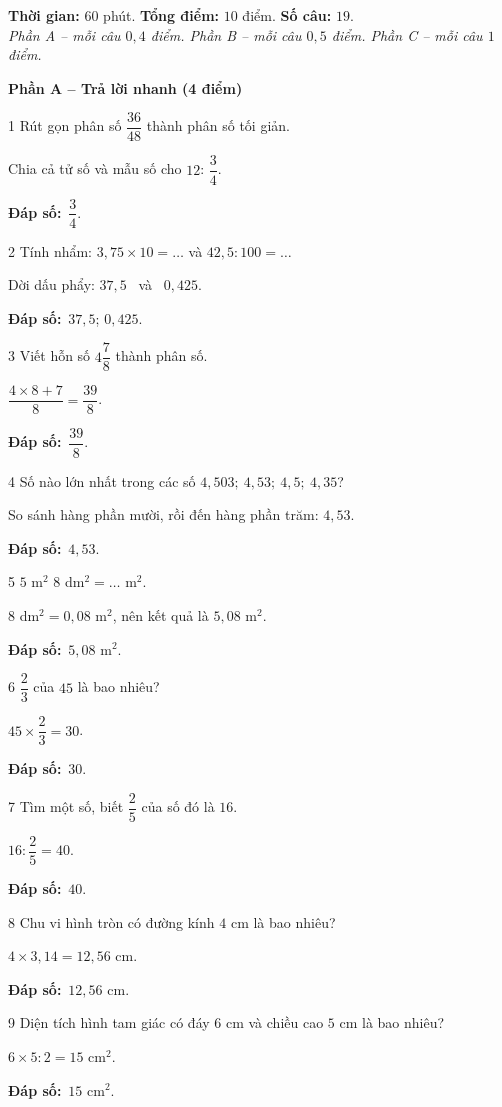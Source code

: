 \documentclass[11pt]{article}
\newif\ifsol \solfalse
\providecommand{\AnsWord}{Đáp số}
\newcommand{\dapso}[1]{\par\textbf{\AnsWord:}\ #1}
\newcommand{\probsol}[1]{%
  \begin{lrbox}{\solmeasure}\begin{minipage}{\dimexpr\linewidth-24pt\relax}#1\end{minipage}\end{lrbox}%
  \ifsol
    \begin{solbox}#1\end{solbox}%
  \else
    \setlength{\solht}{\dimexpr\ht\solmeasure+\dp\solmeasure+0.85cm\relax}%
    \ifdim\solht<1.35cm\setlength{\solht}{1.35cm}\fi
    \begin{tcolorbox}[colback=white,colframe=Line,boxrule=0.8pt,arc=5pt,
      left=8pt,right=8pt,top=4pt,bottom=4pt,height=\solht]{\footnotesize\color{Slate}\itshape\WorkWord}\end{tcolorbox}%
  \fi}
\newcommand{\dividerbar}[1]{\par\vspace{0.6em}\noindent
  \begin{tcolorbox}[enhanced,frame hidden,interior hidden,borderline west={5pt}{0pt}{ProbBlue},
    colback=white,left=12pt,right=12pt,top=5pt,bottom=5pt,arc=4pt]
  {\large\bfseries\color{ProbBlue} #1}\end{tcolorbox}\vspace{0.4em}}
\newcommand{\gap}{\vspace{0.3cm}}
\def\WorkWord{Bài làm:}
\def\AnsWord{Đáp số}
\begin{document}
\begin{knowbox}
\textbf{Thời gian:} $60$ phút. \quad \textbf{Tổng điểm:} $10$ điểm. \quad \textbf{Số câu:} $19$.\\[2pt]\emph{Phần A -- mỗi câu $0{,}4$ điểm. \quad Phần B -- mỗi câu $0{,}5$ điểm. \quad Phần C -- mỗi câu $1$ điểm.}
\end{knowbox}
\gap
\dividerbar{Phần A -- Trả lời nhanh (4 điểm)}
\begin{probbox}{1}{\relax}
Rút gọn phân số $\dfrac{36}{48}$ thành phân số tối giản.
\end{probbox}
\probsol{
Chia cả tử số và mẫu số cho $12$: $\dfrac34$.
\dapso{$\dfrac34$.}}
\gap
\begin{probbox}{2}{\relax}
Tính nhẩm: $3{,}75\times10=\ldots$ \quad và \quad $42{,}5:100=\ldots$
\end{probbox}
\probsol{
Dời dấu phẩy: $37{,}5$ \ và \ $0{,}425$.
\dapso{$37{,}5$; $0{,}425$.}}
\gap
\begin{probbox}{3}{\relax}
Viết hỗn số $4\dfrac78$ thành phân số.
\end{probbox}
\probsol{
$\dfrac{4\times8+7}8=\dfrac{39}8$.
\dapso{$\dfrac{39}8$.}}
\gap
\begin{probbox}{4}{\relax}
Số nào lớn nhất trong các số $4{,}503;\ 4{,}53;\ 4{,}5;\ 4{,}35$?
\end{probbox}
\probsol{
So sánh hàng phần mười, rồi đến hàng phần trăm: $4{,}53$.
\dapso{$4{,}53$.}}
\gap
\begin{probbox}{5}{\relax}
$5$ m$^2$ $8$ dm$^2=\ldots$ m$^2$.
\end{probbox}
\probsol{
$8$ dm$^2=0{,}08$ m$^2$, nên kết quả là $5{,}08$ m$^2$.
\dapso{$5{,}08$ m$^2$.}}
\gap
\begin{probbox}{6}{\relax}
$\dfrac23$ của $45$ là bao nhiêu?
\end{probbox}
\probsol{
$45\times\dfrac23=30$.
\dapso{$30$.}}
\gap
\begin{probbox}{7}{\relax}
Tìm một số, biết $\dfrac25$ của số đó là $16$.
\end{probbox}
\probsol{
$16:\dfrac25=40$.
\dapso{$40$.}}
\gap
\begin{probbox}{8}{\relax}
Chu vi hình tròn có đường kính $4$ cm là bao nhiêu?
\end{probbox}
\probsol{
$4\times3{,}14=12{,}56$ cm.
\dapso{$12{,}56$ cm.}}
\gap
\begin{probbox}{9}{\relax}
Diện tích hình tam giác có đáy $6$ cm và chiều cao $5$ cm là bao nhiêu?
\end{probbox}
\probsol{
$6\times5:2=15$ cm$^2$.
\dapso{$15$ cm$^2$.}}
\end{document}
